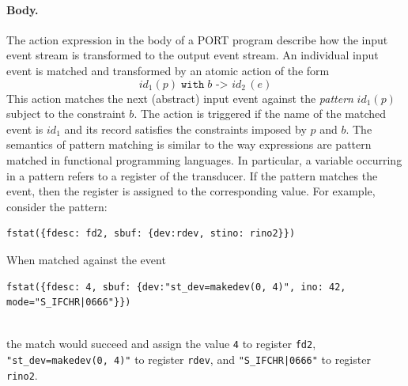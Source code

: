 %
%



\paragraph*{Body.}
The action expression in the body of a PORT program describe how the input event stream is transformed to the output event stream. An individual input event is matched and transformed by an atomic action of the form
\[\mathit{id}_1(p) \;\mathtt{with}\; b \texttt{ -> } \mathit{id}_2\,(e)\]
This action matches the next (abstract) input event against the \emph{pattern} $\mathit{id}_1(p)$ subject to the constraint $b$. The action is triggered if the name of the matched event is $\mathit{id}_1$ and its record satisfies the constraints imposed by $p$ and $b$. The semantics of pattern matching is similar to the way  expressions are pattern matched in functional programming languages. In particular, a variable occurring in a pattern refers to a register of the transducer. If the pattern matches the event, then the register is assigned to the corresponding value. For example, consider the pattern:
\begin{lstlisting}[numbers=none,xleftmargin=0em,gobble=2]
  fstat({fdesc: fd2, sbuf: {dev:rdev, stino: rino2}})
\end{lstlisting}
When matched against the event\\[.3em]
\begin{adjustbox}{max width=\textwidth}
\begin{lstlisting}[numbers=none,xleftmargin=0em,gobble=2,breaklines=false]
  fstat({fdesc: 4, sbuf: {dev:"st_dev=makedev(0, 4)", ino: 42, mode="S_IFCHR|0666"}})
\end{lstlisting}
\end{adjustbox}\\[.5em]
the match would succeed and assign the value \lstinline+4+ to register \lstinline+fd2+, \lstinline+"st_dev=makedev(0, 4)"+ to register \lstinline+rdev+, and \lstinline+"S_IFCHR|0666"+ to register \lstinline+rino2+.

